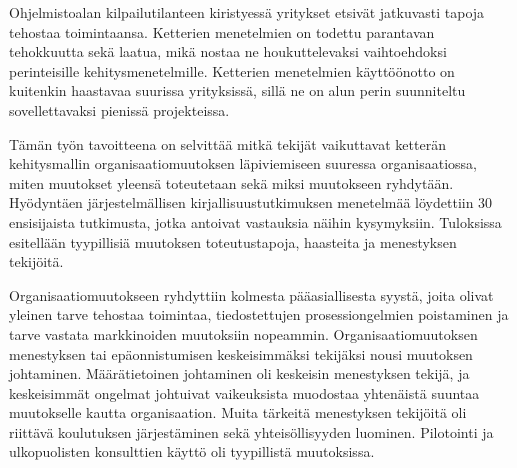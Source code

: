 %
%

\begin{fiabstract}

Ohjelmistoalan kilpailutilanteen kiristyessä yritykset etsivät jatkuvasti tapoja
tehostaa toimintaansa. Ketterien menetelmien on todettu parantavan tehokkuutta
sekä laatua, mikä nostaa ne houkuttelevaksi vaihtoehdoksi perinteisille
kehitysmenetelmille. Ketterien menetelmien käyttöönotto on kuitenkin haastavaa
suurissa yrityksissä, sillä ne on alun perin suunniteltu sovellettavaksi
pienissä projekteissa.

Tämän työn tavoitteena on selvittää mitkä tekijät vaikuttavat ketterän
kehitysmallin organisaatiomuutoksen läpiviemiseen suuressa organisaatiossa,
miten muutokset yleensä toteutetaan sekä miksi muutokseen ryhdytään. Hyödyntäen
järjestelmällisen kirjallisuustutkimuksen menetelmää löydettiin 30 ensisijaista
tutkimusta, jotka antoivat vastauksia näihin kysymyksiin. Tuloksissa esitellään
tyypillisiä muutoksen toteutustapoja, haasteita ja menestyksen tekijöitä.

Organisaatiomuutokseen ryhdyttiin kolmesta pääasiallisesta syystä, joita olivat
yleinen tarve tehostaa toimintaa, tiedostettujen prosessiongelmien poistaminen
ja tarve vastata markkinoiden muutoksiin nopeammin. Organisaatiomuutoksen
menestyksen tai epäonnistumisen keskeisimmäksi tekijäksi nousi muutoksen
johtaminen. Määrätietoinen johtaminen oli keskeisin menestyksen tekijä, ja
keskeisimmät ongelmat johtuivat vaikeuksista muodostaa yhtenäistä suuntaa
muutokselle kautta organisaation. Muita tärkeitä menestyksen tekijöitä oli
riittävä koulutuksen järjestäminen sekä yhteisöllisyyden luominen.
Pilotointi ja ulkopuolisten konsulttien käyttö oli tyypillistä muutoksissa.



%
\end{fiabstract}


